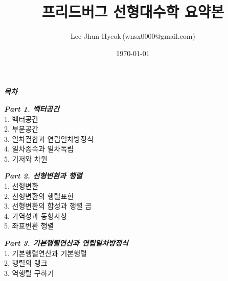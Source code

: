 \documentclass[10pt, a4paper]{article}
\title{\textbf{{\Huge 프리드버그 선형대수학 요약본}}}
\author{Lee Jhun Hyeok\,(wnsx0000@gmail.com)}
\date{\today}
\begin{document}
\maketitle

\textbf{\textit{목차}}

\textbf{\textit{Part 1. 벡터공간\\}}
1. 벡터공간\\
2. 부분공간\\
3. 일차결합과 연립일차방정식\\
4. 일차종속과 일차독립\\
5. 기저와 차원

\textbf{\textit{Part 2. 선형변환과 행렬\\}}
1. 선형변환\\
2. 선형변환의 행렬표현\\
3. 선형변환의 합성과 행렬 곱\\
4. 가역성과 동형사상\\
5. 좌표변환 행렬

\textbf{\textit{Part 3. 기본행렬연산과 연립일차방정식\\}}
1. 기본행렬연산과 기본행렬\\
2. 행렬의 랭크\\
3. 역행렬 구하기\\


\newpage








\end{document}
